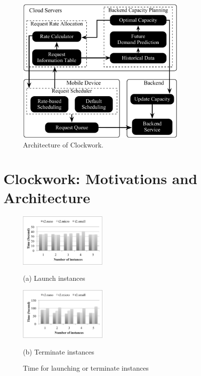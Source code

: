 
\begin{figure}[t]
	\center
	\hspace{-0cm}
	\includegraphics[width=3.3in]{figs/sys}
	\caption{Architecture of Clockwork.} \label{fig:sys}
	\vspace{-0.cm}
\end{figure} 
\section{Clockwork: Motivations and Architecture}\label{sec:background}

\begin{figure}[t]
	\centering
	\hspace{-0.5cm}
	\begin{minipage}[t]{1.7in}
		\centering
		\includegraphics[trim=5mm 5mm 5mm 5mm, clip,width=1.7in]{figs/end}\\
		\centerline{\small{(a) Launch instances}}
	\end{minipage}
	\hspace{-0.2cm}
	\begin{minipage}[t]{1.7in}
		\centering
		\includegraphics[trim=5mm 5mm 5mm 5mm, clip,width=1.7in]{figs/start}\\
		\centerline{\small{(b) Terminate instances}}
	\end{minipage}
	\caption{Time for launching or terminate instances} \label{fig:instance}
\end{figure}

